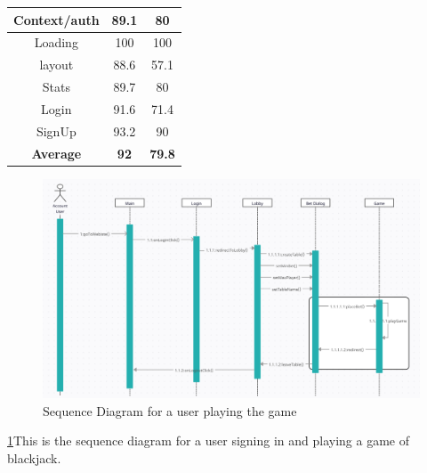 \begin{table}[!hbt]
\begin{tabular}{|ccc|}
\multicolumn{1}{|c|}{Context/auth}       & \multicolumn{1}{c|}{89.1}          & 80            \\ \hline
\multicolumn{1}{|c|}{Loading}            & \multicolumn{1}{c|}{100}           & 100           \\ \hline
\multicolumn{1}{|c|}{layout}             & \multicolumn{1}{c|}{88.6}          & 57.1          \\ \hline
\multicolumn{1}{|c|}{Stats}              & \multicolumn{1}{c|}{89.7}          & 80            \\ \hline
\multicolumn{1}{|c|}{Login}              & \multicolumn{1}{c|}{91.6}          & 71.4          \\ \hline
\multicolumn{1}{|c|}{SignUp}             & \multicolumn{1}{c|}{93.2}          & 90            \\ \hline
\multicolumn{1}{|c|}{\textbf{Average}}   & \multicolumn{1}{c|}{\textbf{92}}   & \textbf{79.8} \\ \hline
\end{tabular}
\end{table}
\label{sprint 2 testing}


\begin{figure}[!hbt]
    \centering
    \includegraphics[width=1.0\linewidth]{figures/sequence.png}
    \caption{Sequence Diagram for a user playing the game}
    \label{fig:sequence}
\end{figure}

\ref{fig:sequence}This is the sequence diagram for a user signing in and playing a game of blackjack. 

